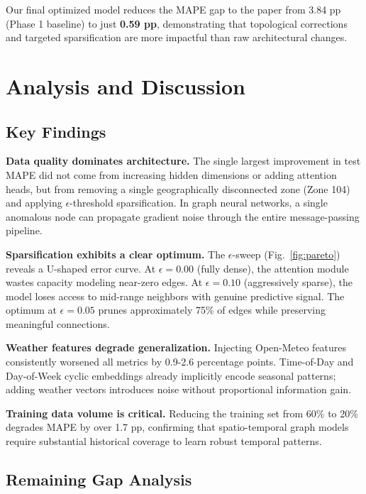 \documentclass{rapportECL}
\begin{document}
\noindent Our final optimized model reduces the MAPE gap to the paper from 3.84 pp (Phase 1 baseline) to just \textbf{0.59 pp}, demonstrating that topological corrections and targeted sparsification are more impactful than raw architectural changes.

\section{Analysis and Discussion}

\subsection{Key Findings}

\textbf{Data quality dominates architecture.} The single largest improvement in test MAPE did not come from increasing hidden dimensions or adding attention heads, but from removing a single geographically disconnected zone (Zone 104) and applying $\epsilon$-threshold sparsification. In graph neural networks, a single anomalous node can propagate gradient noise through the entire message-passing pipeline.

\textbf{Sparsification exhibits a clear optimum.} The $\epsilon$-sweep (Fig.~\ref{fig:pareto}) reveals a U-shaped error curve. At $\epsilon{=}0.00$ (fully dense), the attention module wastes capacity modeling near-zero edges. At $\epsilon{=}0.10$ (aggressively sparse), the model loses access to mid-range neighbors with genuine predictive signal. The optimum at $\epsilon{=}0.05$ prunes approximately 75\% of edges while preserving meaningful connections.

\textbf{Weather features degrade generalization.} Injecting Open-Meteo features consistently worsened all metrics by 0.9-2.6 percentage points. Time-of-Day and Day-of-Week cyclic embeddings already implicitly encode seasonal patterns; adding weather vectors introduces noise without proportional information gain.

\textbf{Training data volume is critical.} Reducing the training set from 60\% to 20\% degrades MAPE by over 1.7 pp, confirming that spatio-temporal graph models require substantial historical coverage to learn robust temporal patterns.

\subsection{Remaining Gap Analysis}
\end{document}
